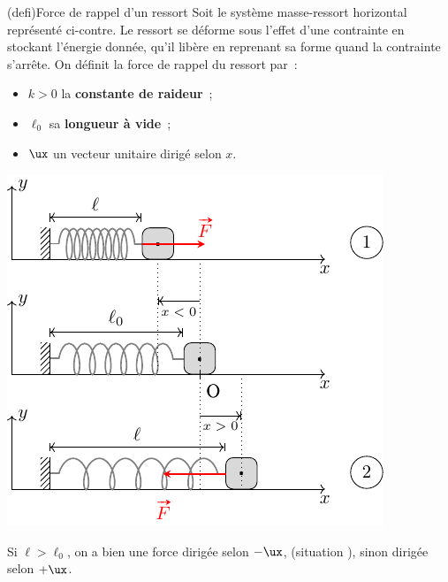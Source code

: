 \documentclass[../../main/main.tex]{subfiles}
\begin{document}
\begin{tcb}[label=defi:ressortdef, sidebyside, righthand ratio=.5](defi){Force de
			rappel d'un ressort}
	Soit le système masse-ressort horizontal représenté ci-contre. Le ressort se
	déforme sous l'effet d'une contrainte en stockant l'énergie donnée, qu'il
	libère en reprenant sa forme quand la contrainte s'arrête. On définit la
	force de rappel du ressort par~:
	\vspace{-15pt}
	\begin{itemize}
		\item $k > 0$ la \textbf{constante de raideur}~;
		\item $\ell_0$ sa \textbf{longueur à vide}~;
		\item $\ux$ un vecteur unitaire 
		      dirigé selon $x$.
	\end{itemize}
	\tcblower
	\begin{center}
		\includegraphics[width=\linewidth]{ressort_def}
	\end{center}
	Si $\ell > \ell_0$, on a bien une force dirigée selon $-\ux$, (situation
	), sinon dirigée selon $+\ux$.
\end{tcb}
\end{document}
